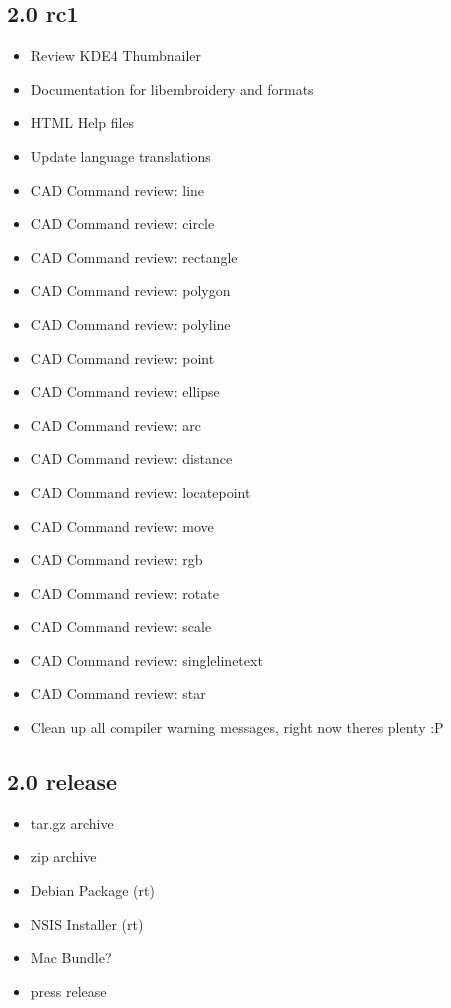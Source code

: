 \documentclass[a4paper]{report}
\begin{document}
\subsection{2.0 rc1}

\begin{itemize}
\item Review KDE4 Thumbnailer
\item Documentation for libembroidery and formats
\item HTML Help files
\item Update language translations
\item CAD Command review: line
\item CAD Command review: circle
\item CAD Command review: rectangle
\item CAD Command review: polygon
\item CAD Command review: polyline
\item CAD Command review: point
\item CAD Command review: ellipse
\item CAD Command review: arc
\item CAD Command review: distance
\item CAD Command review: locatepoint
\item CAD Command review: move
\item CAD Command review: rgb
\item CAD Command review: rotate
\item CAD Command review: scale
\item CAD Command review: singlelinetext
\item CAD Command review: star
\item Clean up all compiler warning messages, right now theres plenty :P
\end{itemize}

\subsection{2.0 release}

\begin{itemize}
\item tar.gz archive
\item zip archive
\item Debian Package (rt)
\item NSIS Installer (rt)
\item Mac Bundle?
\item press release
\end{itemize}
\end{document}
